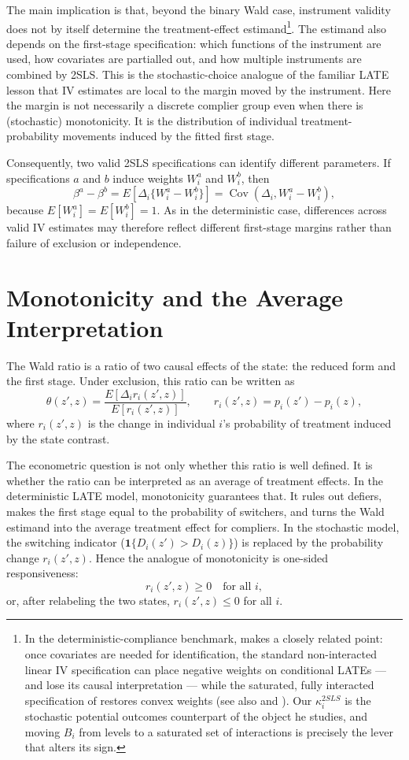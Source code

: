 \documentclass[11pt]{article}
\newcommand{\1}{\mathbf{1}}
\begin{document}
The main implication is that, beyond the binary Wald case, instrument validity does not
by itself determine the treatment-effect estimand\footnote{In the deterministic-compliance benchmark, \cite{sloczynski2020should} makes a closely related point: once covariates are needed for identification, the standard non-interacted linear IV specification can place negative weights on conditional LATEs — and lose its causal interpretation — while the saturated, fully interacted specification of \cite{angristimbens1995} restores convex weights (see also \cite{kolesar2013} and \cite{blandholetal2026}). Our $\kappa_i^{2SLS}$ is the stochastic potential outcomes counterpart of the object he studies, and moving $B_i$ from levels to a saturated set of interactions is precisely the lever that alters its sign.}. The estimand also depends on the
first-stage specification: which functions of the instrument are used, how covariates are
partialled out, and how multiple instruments are combined by 2SLS. This is the
stochastic-choice analogue of the familiar LATE lesson that IV estimates are local to the
margin moved by the instrument. Here the margin is not necessarily a discrete complier
group even when there is (stochastic) monotonicity. It is the distribution of individual treatment-probability movements induced by
the fitted first stage.

Consequently, two valid 2SLS specifications can identify different parameters. If
specifications \(a\) and \(b\) induce weights \(W_i^a\) and \(W_i^b\), then
\[
\beta^a-\beta^b
=
E[\Delta_i\{W_i^a-W_i^b\}]
=
\operatorname{Cov}\!\left(\Delta_i,W_i^a-W_i^b\right),
\]
because \(E[W_i^a]=E[W_i^b]=1\). As in the deterministic case, differences across valid IV estimates may therefore
reflect different first-stage margins rather than failure of exclusion or independence.

\section{Monotonicity and the Average Interpretation}\label{sec:monotonicity}

The Wald ratio is a ratio of two causal effects of the state: the reduced form and the
first stage. Under exclusion, this ratio can be written as
\[
\theta(z',z)
=
\frac{E[\Delta_i r_i(z',z)]}{E[r_i(z',z)]},
\qquad
r_i(z',z)=p_i(z')-p_i(z),
\]
where \(r_i(z',z)\) is the change in individual \(i\)'s probability of treatment induced by
the state contrast.

The econometric question is not only whether this ratio is well defined. It is whether
the ratio can be interpreted as an average of treatment effects. In the deterministic
LATE model, monotonicity guarantees that. It rules out defiers, makes the first
stage equal to the probability of switchers, and turns the Wald estimand into the average
treatment effect for compliers. In the stochastic model, the switching indicator ($\mathbf{1}\{D_i(z')>D_i(z)\}$) is
replaced by the probability change \(r_i(z',z)\). Hence the analogue of monotonicity is
one-sided responsiveness:
\[
r_i(z',z)\geq 0 \quad \text{for all } i,
\]
or, after relabeling the two states, \(r_i(z',z)\leq 0\) for all \(i\).
\end{document}

